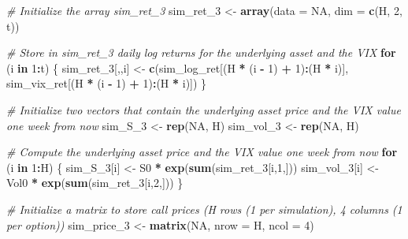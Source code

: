 \documentclass[]{article}
\newenvironment{Shaded}{\begin{snugshade}}{\end{snugshade}}
\newcommand{\CommentTok}[1]{\textcolor[rgb]{0.56,0.35,0.01}{\textit{#1}}}
\newcommand{\ControlFlowTok}[1]{\textcolor[rgb]{0.13,0.29,0.53}{\textbf{#1}}}
\newcommand{\DataTypeTok}[1]{\textcolor[rgb]{0.13,0.29,0.53}{#1}}
\newcommand{\DecValTok}[1]{\textcolor[rgb]{0.00,0.00,0.81}{#1}}
\newcommand{\KeywordTok}[1]{\textcolor[rgb]{0.13,0.29,0.53}{\textbf{#1}}}
\newcommand{\NormalTok}[1]{#1}
\newcommand{\OperatorTok}[1]{\textcolor[rgb]{0.81,0.36,0.00}{\textbf{#1}}}
\newcommand{\OtherTok}[1]{\textcolor[rgb]{0.56,0.35,0.01}{#1}}
\newcommand{\StringTok}[1]{\textcolor[rgb]{0.31,0.60,0.02}{#1}}
\begin{document}
\begin{Shaded}
\begin{Highlighting}[]
\CommentTok{\# Initialize the array \textquotesingle{}sim\_ret\_3\textquotesingle{}}
\NormalTok{sim\_ret\_}\DecValTok{3}\NormalTok{ <{-}}\StringTok{ }\KeywordTok{array}\NormalTok{(}\DataTypeTok{data =} \OtherTok{NA}\NormalTok{, }\DataTypeTok{dim =} \KeywordTok{c}\NormalTok{(H, }\DecValTok{2}\NormalTok{, t))}

\CommentTok{\# Store in \textquotesingle{}sim\_ret\_3\textquotesingle{} daily log returns for the underlying asset and the VIX}
\ControlFlowTok{for}\NormalTok{ (i }\ControlFlowTok{in} \DecValTok{1}\OperatorTok{:}\NormalTok{t) \{}
\NormalTok{  sim\_ret\_}\DecValTok{3}\NormalTok{[,,i] <{-}}\StringTok{ }\KeywordTok{c}\NormalTok{(sim\_log\_ret[(H }\OperatorTok{*}\StringTok{ }\NormalTok{(i }\OperatorTok{{-}}\StringTok{ }\DecValTok{1}\NormalTok{) }\OperatorTok{+}\StringTok{ }\DecValTok{1}\NormalTok{)}\OperatorTok{:}\NormalTok{(H }\OperatorTok{*}\StringTok{ }\NormalTok{i)], sim\_vix\_ret[(H }\OperatorTok{*}\StringTok{ }\NormalTok{(i }\OperatorTok{{-}}\StringTok{ }\DecValTok{1}\NormalTok{) }\OperatorTok{+}\StringTok{ }\DecValTok{1}\NormalTok{)}\OperatorTok{:}\NormalTok{(H }\OperatorTok{*}\StringTok{ }\NormalTok{i)])}
\NormalTok{\}}

\CommentTok{\# Initialize two vectors that contain the underlying asset price and the VIX value one week from now}
\NormalTok{sim\_S\_}\DecValTok{3}\NormalTok{ <{-}}\StringTok{ }\KeywordTok{rep}\NormalTok{(}\OtherTok{NA}\NormalTok{, H)}
\NormalTok{sim\_vol\_}\DecValTok{3}\NormalTok{ <{-}}\StringTok{ }\KeywordTok{rep}\NormalTok{(}\OtherTok{NA}\NormalTok{, H)}

\CommentTok{\# Compute the underlying asset price and the VIX value one week from now}
\ControlFlowTok{for}\NormalTok{ (i }\ControlFlowTok{in} \DecValTok{1}\OperatorTok{:}\NormalTok{H) \{}
\NormalTok{  sim\_S\_}\DecValTok{3}\NormalTok{[i]   <{-}}\StringTok{ }\NormalTok{S0 }\OperatorTok{*}\StringTok{ }\KeywordTok{exp}\NormalTok{(}\KeywordTok{sum}\NormalTok{(sim\_ret\_}\DecValTok{3}\NormalTok{[i,}\DecValTok{1}\NormalTok{,]))}
\NormalTok{  sim\_vol\_}\DecValTok{3}\NormalTok{[i] <{-}}\StringTok{ }\NormalTok{Vol0 }\OperatorTok{*}\StringTok{ }\KeywordTok{exp}\NormalTok{(}\KeywordTok{sum}\NormalTok{(sim\_ret\_}\DecValTok{3}\NormalTok{[i,}\DecValTok{2}\NormalTok{,]))}
\NormalTok{\}}

\CommentTok{\# Initialize a matrix to store call prices (H rows (1 per simulation), 4 columns (1 per option))}
\NormalTok{sim\_price\_}\DecValTok{3}\NormalTok{ <{-}}\StringTok{ }\KeywordTok{matrix}\NormalTok{(}\OtherTok{NA}\NormalTok{, }\DataTypeTok{nrow =}\NormalTok{ H, }\DataTypeTok{ncol =} \DecValTok{4}\NormalTok{)}


\end{Highlighting}
\end{Shaded}
\end{document}
